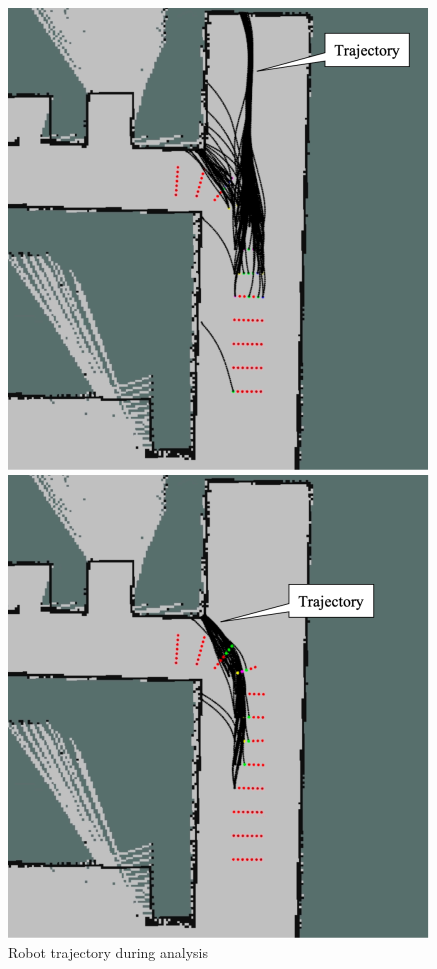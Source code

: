 \documentclass{jarticle}
\begin{document}
\vspace*{-2.5mm}
\begin{figure}[htbp]
  \begin{minipage}[t]{0.5\linewidth}
    \centering
    \includegraphics[keepaspectratio, scale=0.24]{figs/c.png}
  \end{minipage}
  \begin{minipage}[t]{0.5\linewidth}
    \centering
    \includegraphics[keepaspectratio, scale=0.24]{figs/d.png}
  \end{minipage}\vspace*{2mm}
  \caption{Robot trajectory during analysis}
\end{figure}
\end{document}
